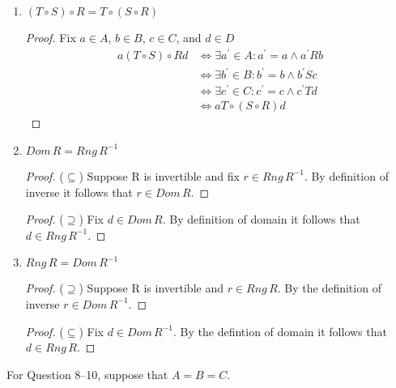 \documentclass{article}
\begin{document}
\begin{enumerate}
    \item $(T \circ S) \circ R = T \circ (S \circ R)$
      \begin{proof}
        Fix $a\in A$, $b\in B$, $c\in C$, and $d\in D$
        \begin{align*}
          a(T\circ S)\circ Rd &\iff \exists a^{'}\in A: a^{'}=a \wedge a^{'}Rb \\
          &\iff \exists b^{'}\in B: b^{'}=b \wedge b^{'}Sc \\
          &\iff \exists c^{'}\in C: c^{'}=c \wedge c^{'}Td \\
          &\iff aT\circ(S\circ R)d
        \end{align*}
      \end{proof}
    \item $Dom\,R = Rng\,R^{-1}$
      \begin{proof} ($\subseteq$)
        Suppose R is invertible and fix $r\in Rng\,R^{-1}$. By definition of inverse it follows that $r\in Dom\,R$.
      \end{proof}
      \begin{proof} ($\supseteq$)
Fix $d\in Dom\,R$. By definition of domain it follows that $d \in Rng\,R^{-1}$.
      \end{proof}
    \item $Rng\,R = Dom\,R^{-1}$
      \begin{proof} ($\supseteq$)
        Suppose R is invertible and $r\in Rng\,R$. By the definition of inverse $r\in Dom\,R^{-1}$.
      \end{proof}
      \begin{proof} ($\subseteq$)
Fix $d\in Dom\,R^{-1}$. By the defintion of domain it follows that $d\in Rng\,R$.
      \end{proof}
  \end{enumerate}
  For Question 8–10, suppose that $A = B = C$.
\end{document}
